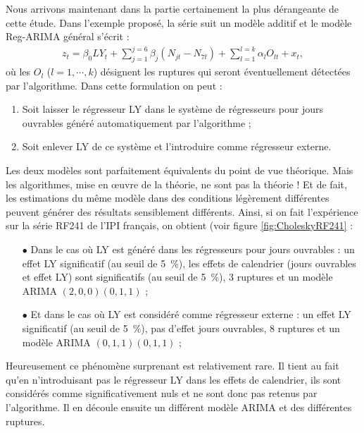 \documentclass[12pt, a4paper, french]{article}
\begin{document}
Nous arrivons maintenant dans la partie certainement la plus dérangeante de cette étude. Dans l'exemple proposé, la série suit un modèle additif et le modèle Reg-ARIMA général s'écrit :
\begin{eqnarray}
	\label{eq:eq4}
z_t=\beta_0 LY_t + \sum_{j=1}^{j=6} \beta_j \left(N_{jt} - N_{7t}\right) + \sum_{l=1}^{l=k} \alpha_l O_{lt} + x_t,
\end{eqnarray}
où les $O_l$ ($l=1, \cdots, k$) désignent les ruptures qui seront éventuellement détectées par l'algorithme. Dans cette formulation on peut :
\begin{enumerate}
	\item Soit laisser le régresseur LY dans le système de régresseurs pour jours ouvrables généré automatiquement par l'algorithme ;
	\item Soit enlever LY de ce système et l'introduire comme régresseur externe.
\end{enumerate}
Les deux modèles sont parfaitement équivalents du point de vue théorique. Mais les algorithmes, mise en œuvre de la théorie, ne sont pas la théorie ! Et de fait, les estimations du même modèle dans des conditions légèrement différentes peuvent générer des résultats sensiblement différents. Ainsi, si on fait l'expérience sur la série RF241 de l'IPI français, on obtient (voir figure \ref{fig:CholeskyRF241} :
\begin{itemize}
	\item[$\bullet$] Dans le cas où LY est généré dans les régresseurs pour jours ouvrables : un effet LY significatif (au seuil de 5~\%), les effets de calendrier (jours ouvrables et effet LY) sont significatifs (au seuil de 5~\%), 3 ruptures et un modèle ARIMA $(2,0,0)(0,1,1)$ ;
	\item[$\bullet$] Et dans le cas où LY est considéré comme régresseur externe : un effet LY significatif (au seuil de 5~\%), pas d'effet jours ouvrables, 8 ruptures et un modèle ARIMA $(0,1,1)(0,1,1)$ ;
\end{itemize}

Heureusement ce phénomène surprenant est relativement rare. Il tient au fait qu'en n'introduisant pas le régresseur LY dans les effets de calendrier, ils sont considérés comme significativement nuls et ne sont donc pas retenus par l'algorithme. Il en découle ensuite un différent modèle ARIMA et des différentes ruptures.
\end{document}
